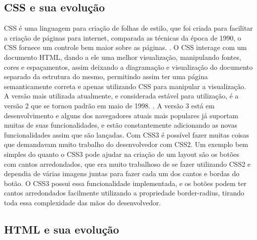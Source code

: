 \subsection{CSS e sua evolução}

CSS é uma linguagem para criação de folhas de estilo, que foi criada
para facilitar a criação de páginas para internet, comparada as técnicas da época de
1990, o CSS fornece um controle bem maior sobre as páginas. \cite{schmitt2009css}.
O CSS interage com um documento HTML, dando a ele uma melhor visualização, manipulando
fontes, cores e espaçamentos, assim deixando a diagramação e visualização do documento
separado da estrutura do mesmo, permitindo assim ter uma página semanticamente correta
e apenas utilizando CSS para manipular a visualização.
A versão mais utilizada atualmente, e considerada estável para utilização, é a versão 2
que se tornou padrão em maio de 1998. \cite{zeldman2009designing}.
A versão 3 está em desenvolvimento e alguns dos navegadores atuais mais populares
já suportam muitas de suas funcionalidades, e estão constantemente
adicionando as novas funcionalidades assim que são lançadas.
Com CSS3 é possível fazer muitas coisas que demandavam muito trabalho
do desenvolvedor com CSS2. Um exemplo bem simples do quanto o CSS3
pode ajudar na criação de um layout são os botões com cantos
arredondados, que era muito trabalhoso de se fazer utilizando CSS2 e
dependia de várias imagens juntas para fazer cada um dos cantos e
bordas do botão. O CSS3 possui essa funcionalidade implementada, e os
botões podem ter cantos arredondados facilmente utilizando a
propriedade border-radius, tirando toda essa complexidade das mãos do
desenvolvedor.

\subsection{HTML e sua evolução}

